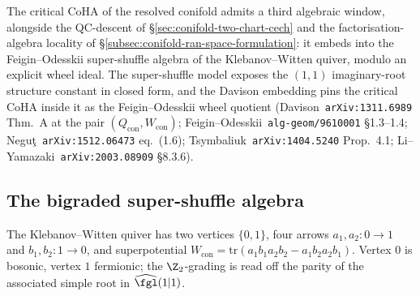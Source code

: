 The critical CoHA of the resolved conifold admits a third algebraic window, alongside the QC-descent of \S\ref{sec:conifold-two-chart-cech} and the factorisation-algebra locality of \S\ref{subsec:conifold-ran-space-formulation}: it embeds into the Feigin--Odesskii super-shuffle algebra of the Klebanov--Witten quiver, modulo an explicit wheel ideal. The super-shuffle model exposes the $(1,1)$ imaginary-root structure constant in closed form, and the Davison embedding pins the critical CoHA inside it as the Feigin--Odesskii wheel quotient (Davison~\texttt{arXiv:1311.6989} Thm.~A at the pair $(Q_{\mathrm{con}}, W_{\mathrm{con}})$; Feigin--Odesskii~\texttt{alg-geom/9610001} \S1.3--1.4; Negu\c{t}~\texttt{arXiv:1512.06473} eq.~(1.6); Tsymbaliuk~\texttt{arXiv:1404.5240} Prop.~4.1; Li--Yamazaki~\texttt{arXiv:2003.08909} \S8.3.6).

\subsection{The bigraded super-shuffle algebra}
\label{subsec:kw-super-shuffle-def}

The Klebanov--Witten quiver has two vertices $\{0, 1\}$, four arrows $a_1, a_2 \colon 0 \to 1$ and $b_1, b_2 \colon 1 \to 0$, and superpotential $W_{\mathrm{con}} = \mathrm{tr}(a_1 b_1 a_2 b_2 - a_1 b_2 a_2 b_1)$. Vertex $0$ is bosonic, vertex $1$ fermionic; the $\Z_2$-grading is read off the parity of the associated simple root in $\widehat{\fgl}(1|1)$.

